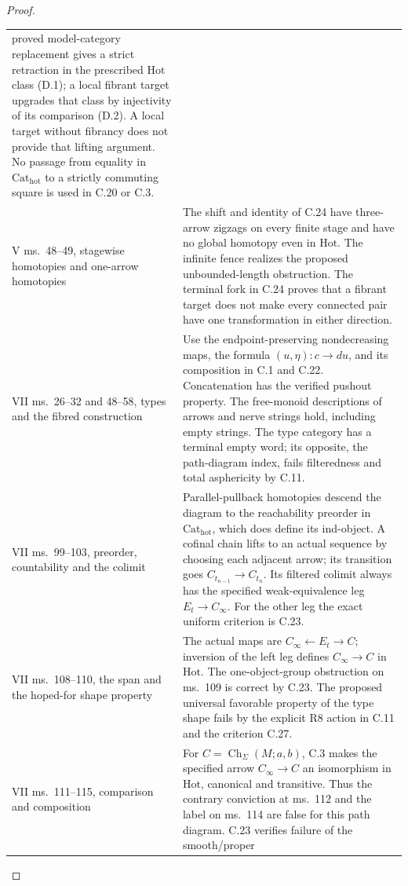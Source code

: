 \begin{proof}
\begin{longtable}{@{}p{}p{}@{}}
proved model-category replacement gives a strict retraction in
the prescribed $\mathrm{Hot}$ class (D.1); a local fibrant
target upgrades that class by injectivity of its comparison
(D.2). A local target without fibrancy does not provide that
lifting argument. No passage from equality in
$\mathrm{Cat}_{\mathrm{hot}}$ to a strictly commuting square
is used in C.20 or C.3.\\
V ms.~48--49, stagewise homotopies and one-arrow homotopies &
The shift and identity of C.24 have three-arrow zigzags on
every finite stage and have no global homotopy even in
$\mathrm{Hot}$. The infinite fence realizes the proposed
unbounded-length obstruction. The terminal fork in C.24 proves
that a fibrant target does not make every connected pair have
one transformation in either direction.\\
VII ms.~26--32 and 48--58, types and the fibred construction &
Use the endpoint-preserving nondecreasing maps, the formula
$(u,\eta):c\to d u$, and its composition in C.1 and C.22.
Concatenation has the verified pushout property. The free-monoid
descriptions of arrows and nerve strings hold, including empty
strings. The type category has a terminal empty word; its
opposite, the path-diagram index, fails filteredness and total
asphericity by C.11.\\
VII ms.~99--103, preorder, countability and the colimit &
Parallel-pullback homotopies descend the diagram to the
reachability preorder in $\mathrm{Cat}_{\mathrm{hot}}$, which
does define its ind-object. A cofinal chain lifts to an actual
sequence by choosing each adjacent arrow; its transition goes
$C_{t_{n-1}}\to C_{t_n}$. Its filtered colimit always has the
specified weak-equivalence leg $E_t\to C_\infty$. For the
other leg the exact uniform criterion is C.23.\\
VII ms.~108--110, the span and the hoped-for shape property &
The actual maps are $C_\infty\leftarrow E_t\to C$; inversion
of the left leg defines $C_\infty\to C$ in $\mathrm{Hot}$.
The one-object-group obstruction on ms.~109 is correct by C.23.
The proposed universal favorable property of the type shape
fails by the explicit R8 action in C.11 and the criterion C.27.\\
VII ms.~111--115, comparison and composition &
For $C=\operatorname{Ch}_\Sigma(M;a,b)$, C.3 makes the
specified arrow $C_\infty\to C$ an isomorphism in
$\mathrm{Hot}$, canonical and transitive. Thus the contrary
conviction at ms.~112 and the label on ms.~114 are false for
this path diagram. C.23 verifies failure of the smooth/proper

\end{longtable}
\end{proof}
